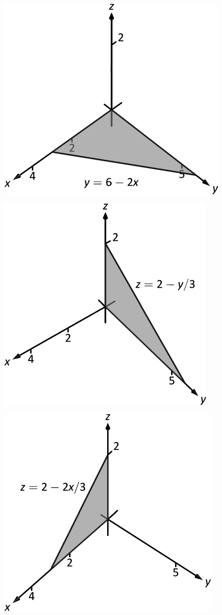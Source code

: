\documentclass[10pt]{article}
\begin{document}
\includegraphics{figtrip2b_3DBW.pdf}
\texttt{}

\includegraphics{figtrip2c_3DBW.pdf}
\texttt{}

\includegraphics{figtrip2d_3DBW.pdf}
\texttt{}
\end{document}
